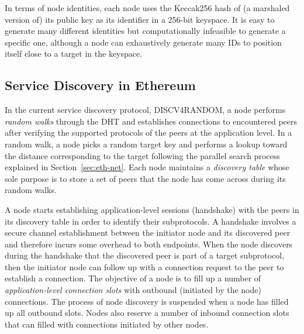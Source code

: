 In terms of node identities, each node uses the Keccak256 hash of (a marshaled version of) its public key as its identifier in a 256-bit keyspace. It is easy to generate many different identities but computationally infeasible to generate a specific one, although a node can exhaustively generate many IDs to position itself close to a target in the keyspace.

\subsection{Service Discovery in Ethereum}
\label{sec:discv4}

In the current service discovery protocol, DISCV4RANDOM, a node performs \textit{random walks} through the DHT and establishes connections to encountered peers after verifying the supported protocols of the peers at the application level. In a random walk, a node picks a random target key and performs a lookup toward the distance corresponding to the target following the parallel search process explained in Section~\ref{sec:eth-net}. Each node maintains a \textit{discovery table} whose sole purpose is to store a set of peers that the node has come across during its random walks. %


A node starts establishing application-level sessions (\ie handshake) with the peers in its discovery table in order to identify their subprotocols. A handshake involves a secure channel establishment between the initiator node and its discovered peer and therefore incurs some overhead to both endpoints. When the node discovers during the handshake that the discovered peer is part of a target subprotocol, then the initiator node can follow up with a connection request to the peer to establish a connection. The objective of a node is to fill up a number of \textit{application-level connection slots} with outbound (\ie initiated by the node) connections. The process of node discovery is suspended when a node has filled up all outbound slots. Nodes also reserve a number of inbound connection slots that can filled with connections initiated by other nodes. 

